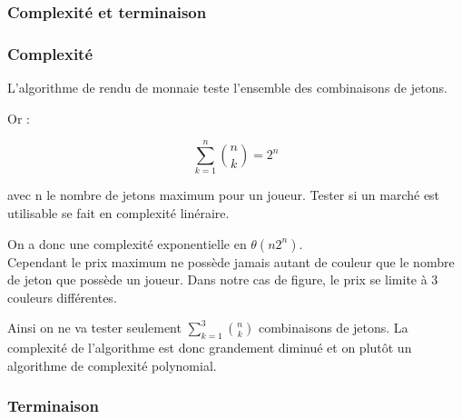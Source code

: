 \subsubsection*{Complexité et terminaison}
\subsubsection*{Complexité}
L'algorithme de rendu de monnaie teste l'ensemble des combinaisons de jetons. 

Or :

\begin{equation}
    \sum_{k=1}^{n} \binom{n}{k} = 2^n
\end{equation}

avec n le nombre de jetons maximum pour un joueur. Tester si un marché est utilisable se fait en complexité linéraire.

On a donc une complexité exponentielle en $\theta(n2^n)$. \\

Cependant le prix maximum ne possède jamais autant de couleur que le nombre de jeton que possède un joueur. Dans notre cas de figure, le prix se limite à 3 couleurs différentes.

Ainsi on ne va tester seulement $\sum_{k=1}^{3} \binom{n}{k}$ combinaisons de jetons. La complexité de l'algorithme est donc grandement diminué et on plutôt un algorithme de complexité polynomial.

\subsubsection*{Terminaison}

